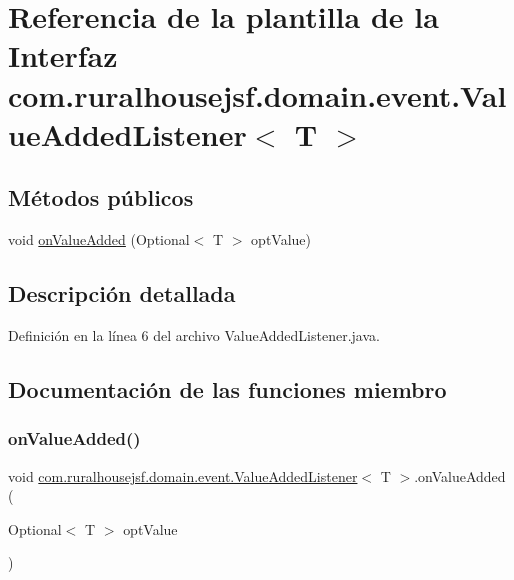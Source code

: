 \hypertarget{interfacecom_1_1ruralhousejsf_1_1domain_1_1event_1_1_value_added_listener}{}\section{Referencia de la plantilla de la Interfaz com.\+ruralhousejsf.\+domain.\+event.\+Value\+Added\+Listener$<$ T $>$}
\label{interfacecom_1_1ruralhousejsf_1_1domain_1_1event_1_1_value_added_listener}
\subsection*{Métodos públicos}
\begin{DoxyCompactItemize}
\item 
void \mbox{\hyperlink{interfacecom_1_1ruralhousejsf_1_1domain_1_1event_1_1_value_added_listener_a69af10ae4e2b293b64b2f337482e6ad8}{on\+Value\+Added}} (Optional$<$ T $>$ opt\+Value)
\end{DoxyCompactItemize}


\subsection{Descripción detallada}


Definición en la línea 6 del archivo Value\+Added\+Listener.\+java.



\subsection{Documentación de las funciones miembro}
\mbox{\label{interfacecom_1_1ruralhousejsf_1_1domain_1_1event_1_1_value_added_listener_a69af10ae4e2b293b64b2f337482e6ad8}} 
\subsubsection{\texorpdfstring{onValueAdded()}{onValueAdded()}}
{\footnotesize\ttfamily void \mbox{\hyperlink{interfacecom_1_1ruralhousejsf_1_1domain_1_1event_1_1_value_added_listener}{com.\+ruralhousejsf.\+domain.\+event.\+Value\+Added\+Listener}}$<$ T $>$.on\+Value\+Added (\begin{DoxyParamCaption}\item[{Optional$<$ T $>$}]{opt\+Value }\end{DoxyParamCaption})}



